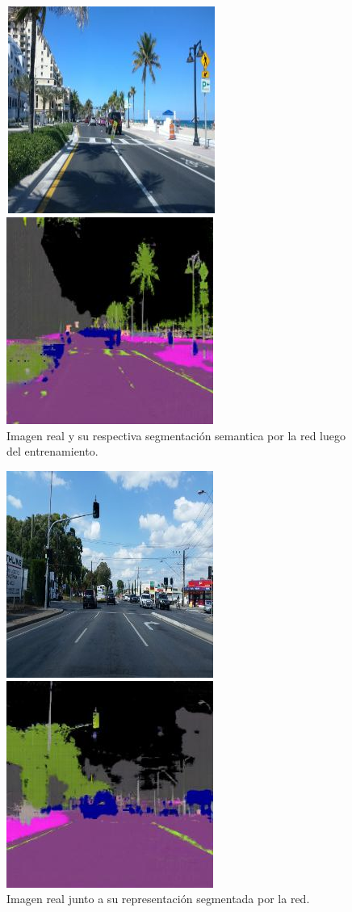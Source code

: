 \documentclass[]{IEEEtran}
\begin{document}
    \begin{figure}[htb]
        \centering
        \includegraphics[width=.4\textwidth]{Imgs/PalmeraRGBSEM.png}    
        \caption{Imagen real y su respectiva segmentación semantica por la red luego del entrenamiento.}
        \label{fig:real-results}
    \end{figure}
    \begin{figure}[htb]
        \centering
        \includegraphics[width=.4\textwidth]{Imgs/SemaforoRGBSEM.png}    
        \caption{Imagen real junto a su representación segmentada por la red.}
        \label{fig:real-results2}
    \end{figure}
\end{document}
